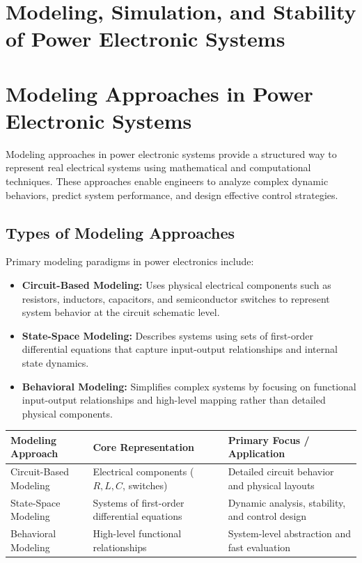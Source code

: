 \documentclass[12pt,a4paper]{article}
\begin{document}
\section*{Modeling, Simulation, and Stability of Power Electronic Systems}

\section{Modeling Approaches in Power Electronic Systems}

Modeling approaches in power electronic systems provide a structured way to represent real electrical systems using mathematical and computational techniques. These approaches enable engineers to analyze complex dynamic behaviors, predict system performance, and design effective control strategies.

\subsection{Types of Modeling Approaches}
Primary modeling paradigms in power electronics include:

\begin{itemize}
    \item \textbf{Circuit-Based Modeling:} Uses physical electrical components such as resistors, inductors, capacitors, and semiconductor switches to represent system behavior at the circuit schematic level.
    \item \textbf{State-Space Modeling:} Describes systems using sets of first-order differential equations that capture input-output relationships and internal state dynamics.
    \item \textbf{Behavioral Modeling:} Simplifies complex systems by focusing on functional input-output relationships and high-level mapping rather than detailed physical components.
\end{itemize}

\begin{center}
\renewcommand{\arraystretch}{1.4}
\begin{tabularx}{\textwidth}{|>{\raggedright\arraybackslash}p{3.5cm}|X|>{\raggedright\arraybackslash}X|}
\hline
\textbf{Modeling Approach} & \textbf{Core Representation} & \textbf{Primary Focus / Application} \\
\hline
Circuit-Based Modeling & Electrical components ($R, L, C$, switches) & Detailed circuit behavior and physical layouts \\
\hline
State-Space Modeling & Systems of first-order differential equations & Dynamic analysis, stability, and control design \\
\hline
Behavioral Modeling & High-level functional relationships & System-level abstraction and fast evaluation \\
\hline
\end{tabularx}
\end{center}
\end{document}
